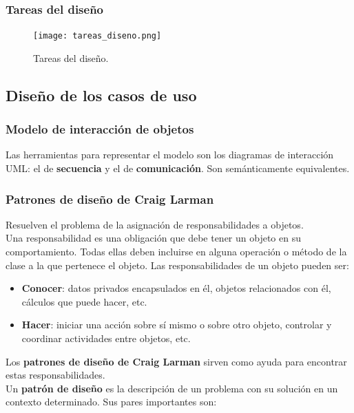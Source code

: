 \documentclass[12pt,spanish]{article}
\begin{document}
\subsubsection{Tareas del diseño}

\begin{figure}[H]
\centering
\texttt{[image: tareas\_diseno.png]}
\caption{Tareas del diseño.}
\end{figure}

\subsection{Diseño de los casos de uso}


\subsubsection{Modelo de interacción de objetos}

Las herramientas para representar el modelo son los diagramas de interacción UML: el de \textbf{secuencia} y el de \textbf{comunicación}. Son semánticamente equivalentes.

\subsubsection{Patrones de diseño de Craig Larman}

Resuelven el problema de la asignación de responsabilidades a objetos.\\

Una responsabilidad es una obligación que debe tener un objeto en su comportamiento. Todas ellas deben incluirse en alguna operación o método de la clase a la que pertenece el objeto. Las responsabilidades de un objeto pueden ser:

\begin{itemize}
	\item \textbf{Conocer}: datos privados encapsulados en él, objetos relacionados con él, cálculos que puede hacer, etc.
	\item \textbf{Hacer}: iniciar una acción sobre sí mismo o sobre otro objeto, controlar y coordinar actividades entre objetos, etc.
\end{itemize}

Los \textbf{patrones de diseño de Craig Larman} sirven como ayuda para encontrar estas responsabilidades.\\

Un \textbf{patrón de diseño} es la descripción de un problema con su solución en un contexto determinado. Sus pares importantes son:
\end{document}

